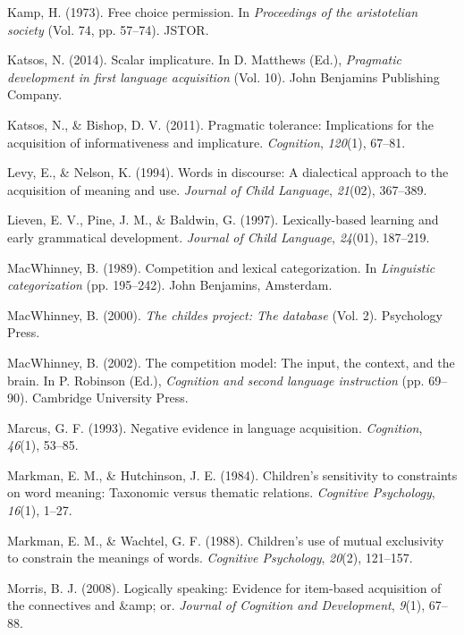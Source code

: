 \documentclass[oneside]{report}
\theoremstyle{definition}
\theoremstyle{definition}
\theoremstyle{definition}
\theoremstyle{remark}
\begin{document}
\hypertarget{ref-kamp1973free}{}
Kamp, H. (1973). Free choice permission. In \emph{Proceedings of the
aristotelian society} (Vol. 74, pp. 57--74). JSTOR.

\hypertarget{ref-katsos2014scalar}{}
Katsos, N. (2014). Scalar implicature. In D. Matthews (Ed.),
\emph{Pragmatic development in first language acquisition} (Vol. 10).
John Benjamins Publishing Company.

\hypertarget{ref-katsos2011pragmatic}{}
Katsos, N., \& Bishop, D. V. (2011). Pragmatic tolerance: Implications
for the acquisition of informativeness and implicature.
\emph{Cognition}, \emph{120}(1), 67--81.

\hypertarget{ref-levy1994words}{}
Levy, E., \& Nelson, K. (1994). Words in discourse: A dialectical
approach to the acquisition of meaning and use. \emph{Journal of Child
Language}, \emph{21}(02), 367--389.

\hypertarget{ref-lieven1997lexically}{}
Lieven, E. V., Pine, J. M., \& Baldwin, G. (1997). Lexically-based
learning and early grammatical development. \emph{Journal of Child
Language}, \emph{24}(01), 187--219.

\hypertarget{ref-macwhinney1989competition}{}
MacWhinney, B. (1989). Competition and lexical categorization. In
\emph{Linguistic categorization} (pp. 195--242). John Benjamins,
Amsterdam.

\hypertarget{ref-macwhinney2000childes}{}
MacWhinney, B. (2000). \emph{The childes project: The database} (Vol.
2). Psychology Press.

\hypertarget{ref-macwhinney2002competition}{}
MacWhinney, B. (2002). The competition model: The input, the context,
and the brain. In P. Robinson (Ed.), \emph{Cognition and second language
instruction} (pp. 69--90). Cambridge University Press.

\hypertarget{ref-marcus1993negative}{}
Marcus, G. F. (1993). Negative evidence in language acquisition.
\emph{Cognition}, \emph{46}(1), 53--85.

\hypertarget{ref-markman1984children}{}
Markman, E. M., \& Hutchinson, J. E. (1984). Children's sensitivity to
constraints on word meaning: Taxonomic versus thematic relations.
\emph{Cognitive Psychology}, \emph{16}(1), 1--27.

\hypertarget{ref-markman1988children}{}
Markman, E. M., \& Wachtel, G. F. (1988). Children's use of mutual
exclusivity to constrain the meanings of words. \emph{Cognitive
Psychology}, \emph{20}(2), 121--157.

\hypertarget{ref-morris2008logically}{}
Morris, B. J. (2008). Logically speaking: Evidence for item-based
acquisition of the connectives and \&amp; or. \emph{Journal of Cognition
and Development}, \emph{9}(1), 67--88.
\end{document}

